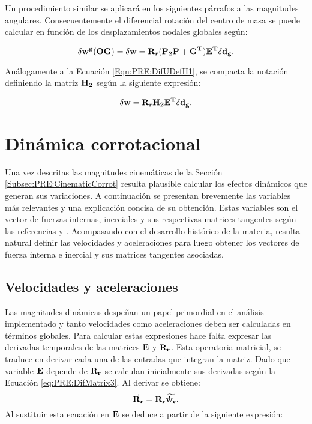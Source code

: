  Un procedimiento similar se aplicará en los siguientes párrafos a las magnitudes angulares. Consecuentemente el diferencial rotación del centro de masa se puede calcular en función de los desplazamientos nodales globales según:

 \begin{equation}\label{Eqn:PRE:AngularBaricentro}
 	\delta \bf{w^g} (OG) =\delta \bf{w} =\bf{R}_r (\bf{P}_2\bf{P}+\bf{G}^T)\bf{E}^T\delta \bf{d}_g .
 \end{equation}

Análogamente a la Ecuación \eqref{Eqn:PRE:DifUDefH1}, se compacta la notación definiendo la matriz $\bf{H}_2$ según la siguiente expresión:

\begin{equation}
	\delta \bf{w}= \bf{R}_r\bf{H}_2\bf{E}^T \delta \bf{d}_g.
\end{equation}




\section{Dinámica corrotacional}\label{Subsec:PRE:DinamicCorrot}

Una vez descritas las magnitudes cinemáticas de la Sección \ref{Subsec:PRE:CinematicCorrot} resulta plausible calcular los efectos dinámicos que generan sus variaciones. A continuación se presentan brevemente las variables más relevantes y una explicación concisa de su obtención. Estas
variables son el vector de fuerzas internas, inerciales y sus respectivas matrices tangentes según las referencias  \citep{Le2014} y \citep{Battini2002}. Acompasando con el desarrollo histórico de la materia, resulta natural definir las velocidades y aceleraciones para luego obtener los vectores de fuerza interna e inercial y sus matrices tangentes asociadas. 

\subsection{Velocidades y aceleraciones}\label{Sec:PRE:VelAc}

Las magnitudes dinámicas despeñan un papel primordial en el análisis implementado y tanto velocidades como aceleraciones deben ser calculadas en términos globales. Para calcular estas expresiones hace falta expresar las derivadas temporales de las matrices $\bf{E}$ y $\bf{R}_r$. Esta operatoria matricial, se traduce en derivar cada una de las entradas que integran la matriz. Dado que variable $\bf{E}$ depende de $\bf{R}_r$ se calculan inicialmente sus derivadas según la Ecuación \eqref{eq:PRE:DifMatrix3}. Al derivar se obtiene: 
\begin{equation}
\dot{\bf{R}_r} = \bf{R_r}\widetilde{\dot{\bf{w}}_r}.
\end{equation}
 Al sustituir esta ecuación en $\dot{\bf{E}}$ se deduce a partir de la siguiente expresión:

